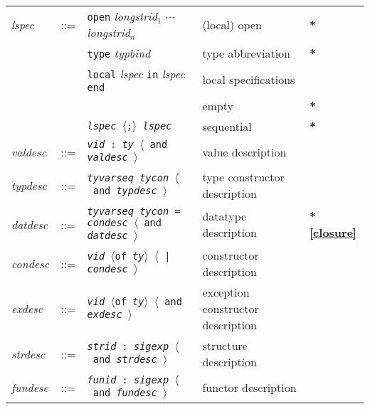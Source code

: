 \documentclass[fleqn]{article}
\newcommand{\x}[1][]{{\bf{*}#1}}
\newcommand{\la}{$\langle$}
\newcommand{\ra}{$\rangle$}
\begin{document}
\begin{tabular}{lllll}
{\it lspec} & ::= & {\tt open} {\it longstrid$_1$\/} $\cdots$\ {\it
  longstrid$_n$\/}
                                        & (local) open & \x \\
& & {\tt type} {\it typbind}            & type abbreviation & \x \\
& & {\tt local} {\it lspec\/} {\tt in} {\it lspec} {\tt end}
        & local specifications & \\
& &                                             & empty & \x \\
& & {\tt {\it lspec\/} $\langle${;}$\rangle$ {\it lspec\/}} & sequential& \x\\[2ex]

{\it valdesc\/} & ::= & {\tt {\it vid\/} :\ {\it ty\/} \la\ and {\it
    valdesc\/} \ra} & value description\\[2ex]

{\it typdesc\/} & ::= & {\tt {\it tyvarseq\/} {\it tycon\/} \la\ and
  {\it typdesc\/} \ra} & type constructor description\\[2ex]
        
{\it datdesc\/} & ::= & {\tt {\it tyvarseq\/} {\it tycon\/} = {\it
    condesc\/} \la\ and {\it datdesc\/} \ra} & datatype description & \x[\ref{closure}] \\[2ex]

{\it condesc\/} & ::= & {\tt {\it vid\/} \la{of} {\it ty\/}\ra\ 
\la\ | {\it condesc\/} \ra} & constructor description\\[2ex]

{\it exdesc\/} & ::= & {\tt {\it vid\/} \la{of} {\it ty\/}\ra\ \la\
  and {\it exdesc\/} \ra} & exception constructor description\\[2ex]

{\it strdesc\/} & ::= & {\tt {\it strid\/} :\ {\it sigexp\/} 
\la\ and {\it strdesc\/} \ra} & structure description\\[2ex]

{\it fundesc\/} & ::= & {\tt {\it funid\/} :\ {\it sigexp\/} 
\la\ and {\it fundesc\/} \ra} & functor description\\[2ex]
\end{tabular}
\end{document}
